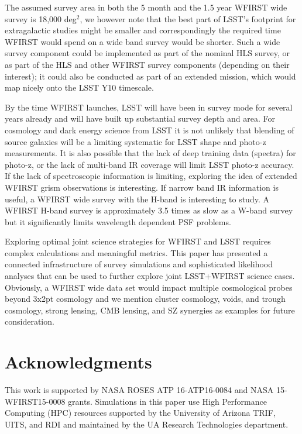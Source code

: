 \documentclass[fleqn,usenatbib,useAMS]{mnras}
\begin{document}
The assumed survey area in both the 5 month and the 1.5 year WFIRST wide survey is 18,000 deg$^2$, we however note that the best part of LSST's footprint for extragalactic studies might be smaller and correspondingly the required time WFIRST would spend on a wide band survey would be shorter. Such a wide survey component could be implemented as part of the nominal HLS survey, or as part of the HLS and other WFIRST survey components (depending on their interest); it could also be conducted as part of an extended mission, which would map nicely onto the LSST Y10 timescale.  

By the time WFIRST launches, LSST will have been in survey mode for several years already and will have built up substantial survey depth and area. For cosmology and dark energy science from LSST it is not unlikely that blending of source galaxies will be a limiting systematic for LSST shape and photo-z measurements. It is also possible that the lack of deep training data (spectra) for photo-z, or the lack of multi-band IR coverage will limit LSST photo-z accuracy. If the lack of spectroscopic information is limiting, exploring the idea of extended WFIRST grism observations is interesting. If narrow band IR information is useful, a WFIRST wide survey with the H-band is interesting to study. A WFIRST H-band survey is approximately 3.5 times as slow as a W-band survey but it significantly limits wavelength dependent PSF problems. 

Exploring optimal joint science strategies for WFIRST and LSST requires complex calculations and meaningful metrics. This paper has presented a connected infrastructure of survey simulations and sophisticated likelihood analyses that can be used to further explore joint LSST+WFIRST science cases. Obviously, a WFIRST wide data set would impact multiple cosmological probes beyond 3x2pt cosmology and we mention cluster cosmology, voids, and trough cosmology, strong lensing, CMB lensing, and SZ synergies as examples for future consideration. 


\section*{Acknowledgments}
This work is supported by NASA ROSES ATP 16-ATP16-0084 and NASA 15-WFIRST15-0008 grants. Simulations in this paper use High Performance Computing (HPC) resources supported by the University of Arizona TRIF, UITS, and RDI and maintained by the UA Research Technologies department. 



\end{document}
